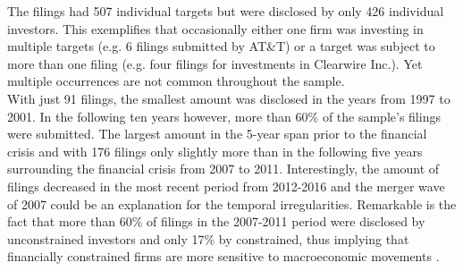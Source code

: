 \documentclass[12pt]{article}
\begin{document}
The filings had 507 individual targets but were disclosed by only 426 individual investors. This exemplifies that occasionally either one firm was investing in multiple targets (e.g. 6 filings submitted by AT\&T) or a target was subject to more than one filing (e.g. four filings for investments in Clearwire Inc.). Yet multiple occurrences are not common throughout the sample.\\
With just 91 filings, the smallest amount was disclosed in the years from 1997 to 2001. In the following ten years however, more than 60\% of the sample's filings were submitted. The largest amount in the 5-year span prior to the financial crisis and with 176 filings only slightly more than in the following five years surrounding the financial crisis from 2007 to 2011. Interestingly, the amount of filings decreased in the most recent period from 2012-2016 and the merger wave of 2007 \citep[p.19]{Huang2017} could be an explanation for the temporal irregularities. Remarkable is the fact that more than 60\% of filings in the 2007-2011 period were disclosed by unconstrained investors and only 17\% by constrained, thus implying that financially constrained firms are more sensitive to macroeconomic movements \citep[p.1197]{Campello2006}.
\pagebreak

\end{document}
